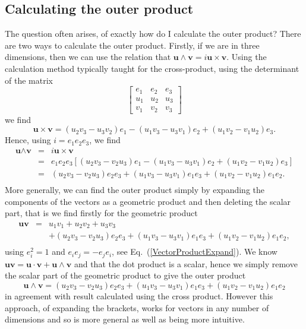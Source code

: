 \documentclass[12pt,aps,prb,preprint]{revtex4}   %
\newcommand{\be}{\begin{equation}}
\newcommand{\ee}{\end{equation}}
\newcommand{\bea}{\begin{eqnarray}}
\newcommand{\eea}{\end{eqnarray}}
\newcommand{\iGA}{{i}}
\begin{document}
\subsection{Calculating the outer product} 

The question often arises, of exactly how do I calculate the outer product?
There are two ways to calculate the outer product.  Firstly, if we are in three dimensions, then we can use the relation that $ \textbf{u} \wedge \textbf{v} = \iGA \textbf{u} \times \textbf{v} $.
Using the calculation method typically taught for the cross-product, using the determinant of the matrix
\be
\begin{bmatrix} e_1 & e_2 & e_3 \\
u_1 & u_2 & u_3 \\
v_1 & v_2 & v_3  \end{bmatrix} 
\ee
we find
\be
\textbf{u} \times \textbf{v} = (u_2 v_3 - u_3 v_2 ) e_1 - (u_1 v_3 - u_3 v_1 ) e_2 + (u_1 v_2 - v_1 u_2 ) e_3 .
\ee
Hence, using $ \iGA = e_1 e_2 e_3 $, we find
\bea
\textbf{u} \wedge \textbf{v} & = & \iGA \textbf{u} \times \textbf{v} \\ \nonumber
& = & e_1 e_2 e_3 [(u_2 v_3 - v_2 u_3 ) e_1 - (u_1 v_3 - u_3 v_1 ) e_2 + (u_1 v_2 - v_1 u_2 ) e_3] \\ \nonumber
& = & (u_2 v_3 - v_2 u_3 ) e_2 e_3  + (u_1 v_3 - u_3 v_1 ) e_1 e_3 + (u_1 v_2 - v_1 u_2 ) e_1 e_2 . \\ \nonumber
\eea
More generally, we can find the outer product simply by expanding the components of the vectors as a geometric product and then deleting the scalar part, that is we find firstly for the geometric product
\bea
\textbf{u} \textbf{v} & = & u_1 v_1 + u_2 v_2 + u_3 v_3 \\ \nonumber
 & & + (u_2 v_3 - v_2 u_3 ) e_2 e_3 + (u_1 v_3 - u_3 v_1 ) e_1 e_3 + (u_1 v_2 - v_1 u_2 ) e_1 e_2, \\ \nonumber
\eea
using $ e_i^2 = 1 $ and $ e_i e_j = - e_j e_i $, see Eq.~(\ref{VectorProductExpand}).
We know $ \textbf{u} \textbf{v} = \textbf{u} \cdot \textbf{v} + \textbf{u} \wedge \textbf{v} $ and that the dot product is a scalar, hence we simply remove the scalar part of the geometric product to give the outer product
\be
\textbf{u} \wedge \textbf{v}  = (u_2 v_3 - v_2 u_3 ) e_2 e_3 + (u_1 v_3 - u_3 v_1 ) e_1 e_3 + (u_1 v_2 - v_1 u_2 ) e_1 e_2
\ee
in agreement with result calculated using the cross product.  However this approach, of expanding the brackets, works for vectors in any number of dimensions and so is more general as well as being more intuitive.
\end{document}
